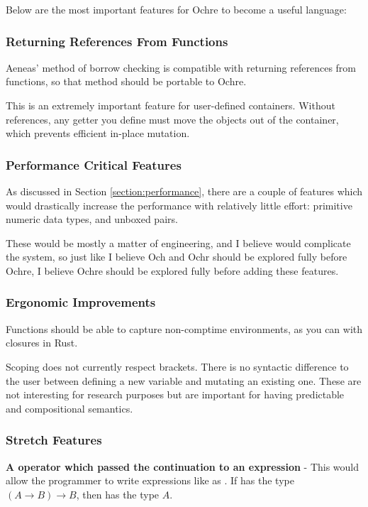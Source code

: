 \documentclass[12pt,twoside]{report}
\begin{document}
Below are the most important features for Ochre to become a useful language:

\subsubsection{Returning References From Functions}
Aeneas' method of borrow checking is compatible with returning references from functions, so that method should be portable to Ochre.

This is an extremely important feature for user-defined containers. Without references, any getter you define must move the objects out of the container, which prevents efficient in-place mutation.

\subsubsection{Performance Critical Features}
As discussed in Section \ref{section:performance}, there are a couple of features which would drastically increase the performance with relatively little effort: primitive numeric data types, and unboxed pairs.

These would be mostly a matter of engineering, and I believe would complicate the system, so just like I believe Och and Ochr should be explored fully before Ochre, I believe Ochre should be explored fully before adding these features.

\subsubsection{Ergonomic Improvements}
Functions should be able to capture non-comptime environments, as you can with closures in Rust.

Scoping does not currently respect brackets. There is no syntactic difference to the user between defining a new variable and mutating an existing one. These are not interesting for research purposes but are important for having predictable and compositional semantics.

\subsubsection{Stretch Features}
\textbf{A  operator which passed the continuation to an expression} -  This would allow the programmer to write expressions like  as . If  has the type $(A \rightarrow B) \rightarrow B$, then  has the type $A$.
\end{document}
